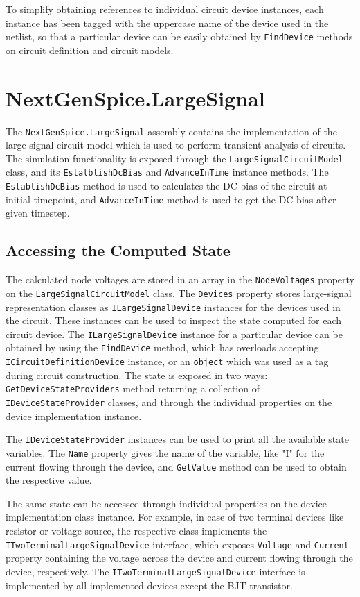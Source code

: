 To simplify obtaining references to individual circuit device instances, each instance has been tagged with the uppercase name of the device used in the netlist, so that a particular device can be easily obtained by \texttt{FindDevice} methods on circuit definition and circuit models.


\section{NextGenSpice.LargeSignal}
\label{chap:userdocs-large-signal}

The \texttt{NextGenSpice.LargeSignal} assembly contains the implementation of the large-signal circuit model which is used to perform transient analysis of circuits. The simulation functionality is exposed through the \texttt{LargeSignalCircuitModel} class, and its \texttt{EstalblishDcBias} and \texttt{AdvanceInTime} instance methods. The \texttt{EstablishDcBias} method is used to calculates the DC bias of the circuit at initial timepoint, and \texttt{AdvanceInTime} method is used to get the DC bias after given timestep.

\subsection{Accessing the Computed State}
The calculated node voltages are stored in an array in the \texttt{NodeVoltages} property on the \texttt{LargeSignalCircuitModel} class. The \texttt{Devices} property stores large-signal representation classes as \texttt{ILargeSignalDevice} instances for the devices used in the circuit. These instances can be used to inspect the state computed for each circuit device. The \texttt{ILargeSignalDevice} instance for a particular device can be obtained by using the \texttt{FindDevice} method, which has overloads accepting \texttt{ICircuitDefinitionDevice} instance, or an \texttt{object} which was used as a tag during circuit construction. The state is exposed in two ways: \texttt{GetDeviceState\+Providers} method returning a collection of \texttt{IDeviceStateProvider} classes, and through the individual properties on the device implementation instance.

The \texttt{IDeviceStateProvider} instances can be used to print all the available state variables. The \texttt{Name} property gives the name of the variable, like "I" for the current flowing through the device, and \texttt{GetValue} method can be used to obtain the respective value.

The same state can be accessed through individual properties on the device implementation class instance. For example, in case of two terminal devices like resistor or voltage source, the respective class implements the \texttt{ITwoTerminalLarge\+SignalDevice} interface, which exposes \texttt{Voltage} and \texttt{Current} property containing the voltage across the device and current flowing through the device, respectively. The \texttt{ITwoTerminalLargeSignalDevice} interface is implemented by all implemented devices except the BJT transistor.

